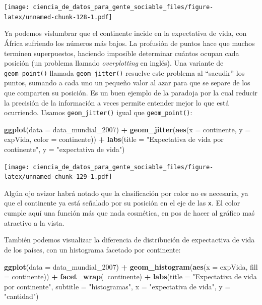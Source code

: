 \documentclass[spanish,]{book}
\newenvironment{Shaded}{\begin{snugshade}}{\end{snugshade}}
\newcommand{\DataTypeTok}[1]{\textcolor[rgb]{0.13,0.29,0.53}{#1}}
\newcommand{\DecValTok}[1]{\textcolor[rgb]{0.00,0.00,0.81}{#1}}
\newcommand{\KeywordTok}[1]{\textcolor[rgb]{0.13,0.29,0.53}{\textbf{#1}}}
\newcommand{\NormalTok}[1]{#1}
\newcommand{\OperatorTok}[1]{\textcolor[rgb]{0.81,0.36,0.00}{\textbf{#1}}}
\newcommand{\StringTok}[1]{\textcolor[rgb]{0.31,0.60,0.02}{#1}}
\begin{document}
\texttt{[image: ciencia\_de\_datos\_para\_gente\_sociable\_files/figure-latex/unnamed-chunk-128-1.pdf]}

Ya podemos vislumbrar que el continente incide en la expectativa de vida, con África sufriendo los números más bajos. La profusión de puntos hace que muchos terminen superpuestos, haciendo imposible determinar cuántos ocupan cada posición (un problema llamado \emph{overplotting} en inglés). Una variante de \texttt{geom\_point()} llamada \texttt{geom\_jitter()} resuelve este problema al ``sacudir'' los puntos, sumando a cada uno un pequeño valor al azar para que se separe de los que comparten su posición. Es un buen ejemplo de la paradoja por la cual reducir la precisión de la información a veces permite entender mejor lo que está ocurriendo. Usamos \texttt{geom\_jitter()} igual que \texttt{geom\_point()}:

\begin{Shaded}
\begin{Highlighting}[]
\KeywordTok{ggplot}\NormalTok{(}\DataTypeTok{data =}\NormalTok{ data_mundial_}\DecValTok{2007}\NormalTok{) }\OperatorTok{+}
\StringTok{    }\KeywordTok{geom_jitter}\NormalTok{(}\KeywordTok{aes}\NormalTok{(}\DataTypeTok{x =}\NormalTok{ continente, }\DataTypeTok{y =}\NormalTok{ expVida, }\DataTypeTok{color =}\NormalTok{ continente)) }\OperatorTok{+}
\StringTok{    }\KeywordTok{labs}\NormalTok{(}\DataTypeTok{title =} \StringTok{"Expectativa de vida por continente"}\NormalTok{,}
         \DataTypeTok{y =} \StringTok{"expectativa de vida"}\NormalTok{)}
\end{Highlighting}
\end{Shaded}

\texttt{[image: ciencia\_de\_datos\_para\_gente\_sociable\_files/figure-latex/unnamed-chunk-129-1.pdf]}

Algún ojo avizor habrá notado que la clasificación por color no es necesaria, ya que el continente ya está señalado por su posición en el eje de las \texttt{x}. El color cumple aquí una función más que nada cosmética, en pos de hacer al gráfico maś atractivo a la vista.

También podemos visualizar la diferencia de distribución de expectactiva de vida de los países, con un histograma facetado por continente:

\begin{Shaded}
\begin{Highlighting}[]
\KeywordTok{ggplot}\NormalTok{(}\DataTypeTok{data =}\NormalTok{ data_mundial_}\DecValTok{2007}\NormalTok{) }\OperatorTok{+}
\StringTok{    }\KeywordTok{geom_histogram}\NormalTok{(}\KeywordTok{aes}\NormalTok{(}\DataTypeTok{x =}\NormalTok{ expVida, }\DataTypeTok{fill =}\NormalTok{ continente)) }\OperatorTok{+}
\StringTok{    }\KeywordTok{facet_wrap}\NormalTok{(}\OperatorTok{~}\NormalTok{continente) }\OperatorTok{+}
\StringTok{    }\KeywordTok{labs}\NormalTok{(}\DataTypeTok{title =} \StringTok{"Expectativa de vida por continente"}\NormalTok{,}
         \DataTypeTok{subtitle =} \StringTok{"histogramas"}\NormalTok{,}
        \DataTypeTok{x =} \StringTok{"expectativa de vida"}\NormalTok{,}
        \DataTypeTok{y =} \StringTok{"cantidad"}\NormalTok{)}
\end{Highlighting}
\end{Shaded}
\end{document}
